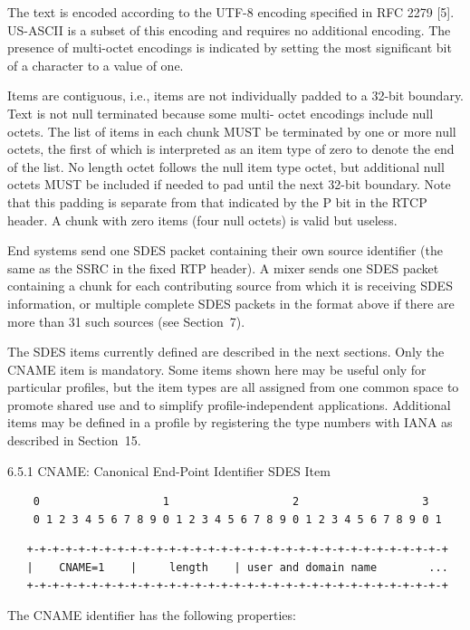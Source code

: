 \documentclass{article}
\begin{document}
The text is encoded according to the UTF-8 encoding specified in RFC 2279 [5].  US-ASCII is a subset of this encoding and requires no additional encoding.  The presence of multi-octet encodings is indicated by setting the most significant bit of a character to a value of one.

Items are contiguous, i.e., items are not individually padded to a 32-bit boundary.  Text is not null terminated because some multi- octet encodings include null octets.  The list of items in each chunk MUST be terminated by one or more null octets, the first of which is interpreted as an item type of zero to denote the end of the list. No length octet follows the null item type octet, but additional null octets MUST be included if needed to pad until the next 32-bit boundary.  Note that this padding is separate from that indicated by the P bit in the RTCP header.  A chunk with zero items (four null octets) is valid but useless.

End systems send one SDES packet containing their own source identifier (the same as the SSRC in the fixed RTP header).  A mixer sends one SDES packet containing a chunk for each contributing source from which it is receiving SDES information, or multiple complete SDES packets in the format above if there are more than 31 such sources (see Section~7).

The SDES items currently defined are described in the next sections. Only the CNAME item is mandatory.  Some items shown here may be useful only for particular profiles, but the item types are all assigned from one common space to promote shared use and to simplify profile-independent applications.  Additional items may be defined in a profile by registering the type numbers with IANA as described in Section~15.

6.5.1 CNAME: Canonical End-Point Identifier SDES Item

\begin{verbatim}
    0                   1                   2                   3
    0 1 2 3 4 5 6 7 8 9 0 1 2 3 4 5 6 7 8 9 0 1 2 3 4 5 6 7 8 9 0 1
\end{verbatim}

\begin{verbatim}
   +-+-+-+-+-+-+-+-+-+-+-+-+-+-+-+-+-+-+-+-+-+-+-+-+-+-+-+-+-+-+-+-+
   |    CNAME=1    |     length    | user and domain name        ...
   +-+-+-+-+-+-+-+-+-+-+-+-+-+-+-+-+-+-+-+-+-+-+-+-+-+-+-+-+-+-+-+-+
\end{verbatim}

The CNAME identifier has the following properties:
\end{document}
